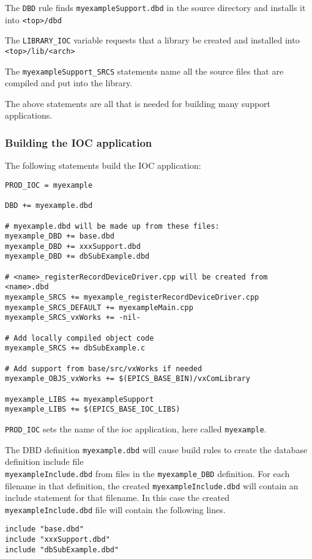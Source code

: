 The \verb|DBD| rule finds \verb|myexampleSupport.dbd| in the source directory and installs it into \verb|<top>/dbd|

The \verb|LIBRARY_IOC| variable requests that a library be created and installed into \verb|<top>/lib/<arch>|

The \verb|myexampleSupport_SRCS| statements name all the source files that are compiled and put into the library.

The above statements are all that is needed for building many support applications.

\subsubsection{Building the IOC application}

The following statements build the IOC application:

\begin{verbatim}
PROD_IOC = myexample

DBD += myexample.dbd

# myexample.dbd will be made up from these files:
myexample_DBD += base.dbd
myexample_DBD += xxxSupport.dbd
myexample_DBD += dbSubExample.dbd

# <name>_registerRecordDeviceDriver.cpp will be created from <name>.dbd
myexample_SRCS += myexample_registerRecordDeviceDriver.cpp
myexample_SRCS_DEFAULT += myexampleMain.cpp
myexample_SRCS_vxWorks += -nil-

# Add locally compiled object code
myexample_SRCS += dbSubExample.c

# Add support from base/src/vxWorks if needed
myexample_OBJS_vxWorks += $(EPICS_BASE_BIN)/vxComLibrary

myexample_LIBS += myexampleSupport
myexample_LIBS += $(EPICS_BASE_IOC_LIBS)
\end{verbatim}

\verb|PROD_IOC| sets the name of the ioc application, here called \verb|myexample|.

The DBD definition \verb|myexample.dbd| will cause build rules to create the database definition include file \\
\verb|myexampleInclude.dbd| from files in the \verb|myexample_DBD| definition. For each filename in that
definition, the created \verb|myexampleInclude.dbd| will contain an include statement for that filename.
In this case the created \verb|myexampleInclude.dbd| file will contain the following lines.

\begin{verbatim}
include "base.dbd"
include "xxxSupport.dbd"
include "dbSubExample.dbd"
\end{verbatim}

